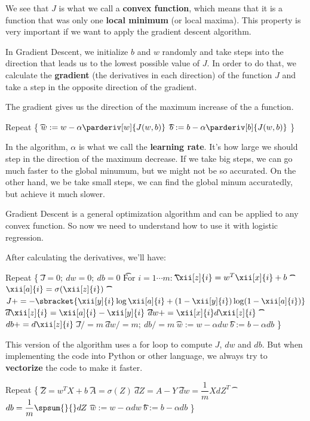 \documentclass[12pt, a4paper, oneside]{book}
\begin{document}
We see that $J$ is what we call a \textbf{convex function}, which means that it
is a function that was only one \textbf{local minimum} (or local maxima). This
property is very important if we want to apply the gradient descent algorithm.

In Gradient Descent, we initialize $b$ and $w$ randomly and take steps into the
direction that leads us to the lowest possible value of $J$. In order to do
that, we calculate the \textbf{gradient} (the derivatives in each direction) of
the function $J$ and take a step in the opposite direction of the gradient.

\begin{prop}
The gradient gives us the direction of the maximum increase of the a function.
\end{prop}

\begin{algorithm}
Repeat \{ \nl
\t $w:=w-\alpha\parderiv[w]{J(w,b)}$ \nl
\t $b:=b-\alpha\parderiv[b]{J(w,b)}$ \nl
\}
\end{algorithm}

In the algorithm, $\alpha$ is what we call the \textbf{learning rate}. It's how
large we should step in the direction of the maximum decrease. If we take big
steps, we can go much faster to the global minumum, but we might not be so
accurated. On the other hand, we be take small steps, we can find the global
minum accuratedly, but achieve it much slower.

Gradient Descent is a general optimization algorithm and can be applied to any
convex function. So now we need to understand how to use it with logistic
regression.

After calculating the derivatives, we'll have:

\begin{algorithm}
Repeat \{ \nl
\t$J=0;~dw=0;~db=0$ \nl
\t For $i=1\cdots m$:\nl
\t\t $\xii[z]{i}=w^{T}\xii[x]{i}+b$\nl
\t\t $\xii[a]{i}=\sigma(\xii[z]{i})$\nl
\t\t $J+=
-\sbracket{\xii[y]{i}\log\xii[a]{i}+(1-\xii[y]{i})\log(1-\xii[a]{i})}$\nl
\t\t $d\xii[z]{i}=\xii[a]{i}-\xii[y]{i}$\nl
\t\t $dw += \xii[x]{i}d\xii[z]{i}$\nl
\t\t $db += d\xii[z]{i}$\nl
\t $J/=m$\nl
\t $dw/=m;~db/=m$\nl
\t $w:=w-\alpha dw$ \nl
\t $b:=b-\alpha db$ \nl
\}
\end{algorithm}

This version of the algorithm uses a for loop to compute $J$, $dw$ and $db$. But
when implementing the code into Python or other language, we always try to
\textbf{vectorize} the code to make it faster.

\begin{algorithm}
Repeat \{ \nl
\t $Z=w^{T}X+b$ \nl
\t $A=\sigma(Z)$ \nl
\t $dZ = A - Y$ \nl
\t $dw = \dfrac{1}{m}XdZ^{T}$ \nl
\t $db = \dfrac{1}{m}\spsum{}{}dZ$ \nl
\t $w:=w-\alpha dw$ \nl
\t $b:=b-\alpha db$ \nl
\}
\end{algorithm}

\end{document}
